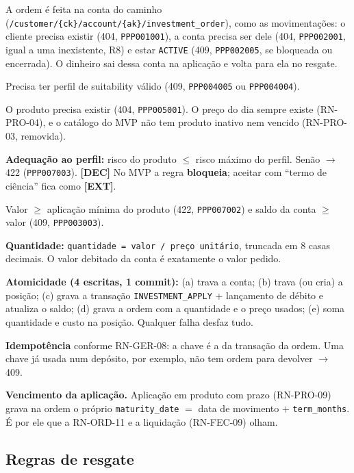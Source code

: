 \documentclass[11pt,a4paper]{article}
\newcommand{\obr}{\textbf{[OBR]}}          %
\newcommand{\dec}{\textbf{[DEC]}}          %
\newcommand{\ext}{\textbf{[EXT]}}          %
\newcommand{\tb}[1]{\texttt{#1}}           %
\begin{document}
\begin{regras}
  \item[RN-ORD-01 \obr] A ordem é feita na conta do caminho
  (\tb{/customer/\{ck\}/account/\{ak\}/investment_order}), como as movimentações: o cliente precisa
  existir (404, \tb{PPP001001}), a conta precisa ser dele (404, \tb{PPP002001}, igual a uma
  inexistente, R8) e estar \tb{ACTIVE} (409, \tb{PPP002005}, se bloqueada ou encerrada). O dinheiro
  sai dessa conta na aplicação e volta para ela no resgate.
  \item[RN-ORD-02 \obr] Precisa ter perfil de suitability válido (409, \tb{PPP004005} ou
  \tb{PPP004004}).
  \item[RN-ORD-03 \obr] O produto precisa existir (404, \tb{PPP005001}). O preço do dia sempre
  existe (RN-PRO-04), e o catálogo do MVP não tem produto inativo nem vencido (RN-PRO-03, removida).
  \item[RN-ORD-04 \obr] \textbf{Adequação ao perfil:} risco do produto $\le$ risco máximo do perfil.
  Senão $\to$ 422 (\tb{PPP007003}). \dec{} No MVP a regra \textbf{bloqueia}; aceitar com ``termo
  de ciência'' fica como \ext.
  \item[RN-ORD-05 \obr] Valor $\ge$ aplicação mínima do produto (422, \tb{PPP007002}) e saldo da
  conta $\ge$ valor (409, \tb{PPP003003}).
  \item[RN-ORD-06 \dec] \textbf{Quantidade:} \tb{quantidade = valor / preço unitário}, truncada
  em 8 casas decimais. O valor debitado da conta é exatamente o valor pedido.
  \item[RN-ORD-07 \obr] \textbf{Atomicidade (4 escritas, 1 commit):} (a) trava a conta; (b) trava
  (ou cria) a posição; (c) grava a transação \tb{INVESTMENT_APPLY} + lançamento de débito e
  atualiza o saldo; (d) grava a ordem com a quantidade e o preço usados; (e) soma quantidade e
  custo na posição. Qualquer falha desfaz tudo.
  \item[RN-ORD-08 \obr] \textbf{Idempotência} conforme RN-GER-08: a chave é a da transação da
  ordem. Uma chave já usada num depósito, por exemplo, não tem ordem para devolver $\to$ 409.
  \item[RN-ORD-17 \dec] \textbf{Vencimento da aplicação.} Aplicação em produto com prazo
  (RN-PRO-09) grava na ordem o próprio \tb{maturity_date} $=$ data de movimento $+$
  \tb{term_months}. É por ele que a RN-ORD-11 e a liquidação (RN-FEC-09) olham.
\end{regras}

\subsection{Regras de resgate}
\end{document}
